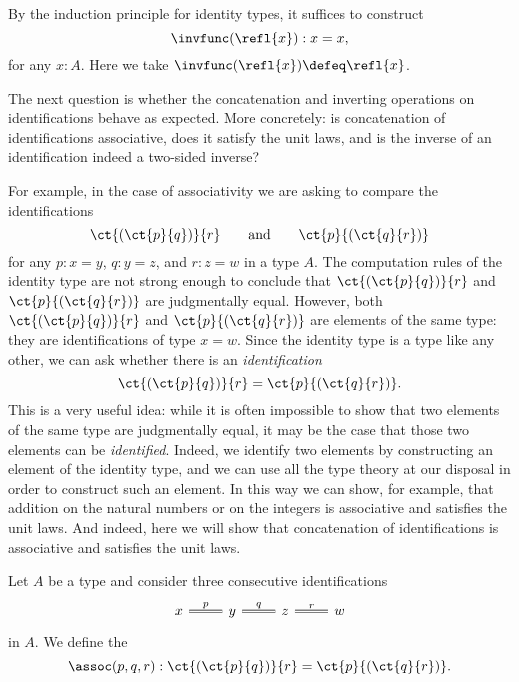 \begin{constr}
By the induction principle for identity types, it suffices to construct
\begin{equation*}
\invfunc(\refl{x}): x=x,
\end{equation*}
for any $x:A$. Here we take $\invfunc(\refl{x})\defeq \refl{x}$.
\end{constr}

The next question is whether the concatenation and inverting operations on identifications behave as expected. More concretely: is concatenation of identifications associative, does it satisfy the unit laws, and is the inverse of an identification indeed a two-sided inverse?

For example, in the case of associativity we are asking to compare the identifications
\begin{equation*}
  \ct{(\ct{p}{q})}{r}\qquad\text{and}\qquad\ct{p}{(\ct{q}{r})}
\end{equation*}
for any $p:x=y$, $q:y=z$, and $r:z=w$ in a type $A$. The computation rules of the identity type are not strong enough to conclude that $\ct{(\ct{p}{q})}{r}$ and $\ct{p}{(\ct{q}{r})}$ are judgmentally equal. However, both $\ct{(\ct{p}{q})}{r}$ and $\ct{p}{(\ct{q}{r})}$ are elements of the same type: they are identifications of type $x=w$. Since the identity type is a type like any other, we can ask whether there is an \emph{identification}
\begin{equation*}
\ct{(\ct{p}{q})}{r}=\ct{p}{(\ct{q}{r})}.
\end{equation*}
This is a very useful idea: while it is often impossible to show that two elements of the same type are judgmentally equal, it may be the case that those two elements can be \emph{identified}. Indeed, we identify two elements by constructing an element of the identity type, and we can use all the type theory at our disposal in order to construct such an element. In this way we can show, for example, that addition on the natural numbers or on the integers is associative and satisfies the unit laws. And indeed, here we will show that concatenation of identifications is associative and satisfies the unit laws.

\begin{defn}\label{defn:id_assoc}
  Let $A$ be a type and consider three consecutive identifications
  \begin{equation*}
    \begin{tikzcd}
      x \arrow[r,equals,"p"] & y \arrow[r,equals,"q"] & z \arrow[r,equals,"r"] & w
    \end{tikzcd}
  \end{equation*}
  in $A$. We define the 
  \begin{equation*}
    \assoc(p,q,r) : \ct{(\ct{p}{q})}{r}=\ct{p}{(\ct{q}{r})}.
  \end{equation*}
\end{defn}

